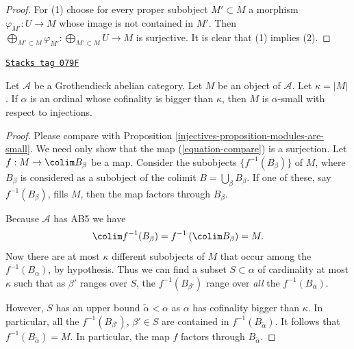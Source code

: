 \begin{proof}
For (1) choose for every proper subobject $M' \subset M$ a morphism
$\varphi_{M'} : U \to M$ whose image is not contained in $M'$. Then
$\bigoplus_{M' \subset M} \varphi_{M'} : \bigoplus_{M' \subset M} U \to M$
is surjective. It is clear that (1) implies (2).
\end{proof}

\begin{proposition}
\label{injectives-proposition-objects-are-small}
\href{https://stacks.math.columbia.edu/tag/079F}{\texttt{Stacks tag 079F}}

Let $\mathcal{A}$ be a Grothendieck abelian category. Let $M$ be an
object of $\mathcal{A}$. Let $\kappa = |M|$.
If $\alpha$ is an ordinal whose cofinality is bigger than $\kappa$,
then $M$ is $\alpha$-small with respect to injections.
\end{proposition}

\begin{proof}

Please compare with Proposition \ref{injectives-proposition-modules-are-small}.
We need only show that the map (\ref{equation-compare}) is a surjection.
Let $f : M \to \colim B_\beta$ be a map.
Consider the subobjects $\{f^{-1}(B_\beta)\}$ of $M$, where $B_\beta$
is considered as a subobject of the colimit $B = \bigcup_\beta B_\beta$.
If one of these, say $f^{-1}(B_\beta)$, fills $M$,
then the map factors through $B_\beta$.

\medskip\noindent
Because $\mathcal{A}$ has AB5 we have
$$
\colim f^{-1}(B_\beta) = f^{-1}\left(\colim B_\beta\right) = M.
$$
Now there are at most $\kappa$ different subobjects of $M$ that occur among
the $f^{-1}(B_\alpha)$, by hypothesis.
Thus we can find a subset $S \subset \alpha$ of cardinality at most
$\kappa$ such that as $\beta'$ ranges over $S$, the
$f^{-1}(B_{\beta'})$ range over \emph{all} the $f^{-1}(B_\alpha)$.

\medskip\noindent
However, $S$ has an upper bound $\widetilde{\alpha} < \alpha$ as
$\alpha$ has cofinality bigger than $\kappa$. In particular, all the
$f^{-1}(B_{\beta'})$, $\beta' \in S$ are contained in
$f^{-1}(B_{\widetilde{\alpha}})$.
It follows that $f^{-1}(B_{\widetilde{\alpha}}) = M$.
In particular, the map $f$ factors through $B_{\widetilde{\alpha}}$.
\end{proof}

